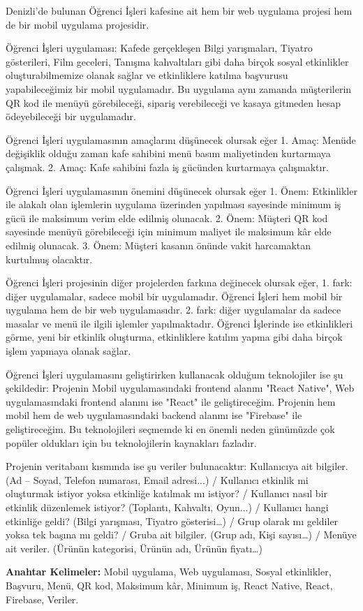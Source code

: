 Denizli’de bulunan Öğrenci İşleri kafesine ait hem bir web uygulama projesi hem de bir mobil uygulama projesidir.

Öğrenci İşleri uygulaması: Kafede gerçekleşen Bilgi yarışmaları, Tiyatro gösterileri, Film geceleri, Tanışma kahvaltıları gibi daha birçok sosyal etkinlikler oluşturabilmemize olanak sağlar ve etkinliklere katılma başvurusu yapabileceğimiz bir mobil uygulamadır. Bu uygulama aynı zamanda müşterilerin QR kod ile menüyü görebileceği, sipariş verebileceği ve kasaya gitmeden hesap ödeyebileceği bir uygulamadır. 

Öğrenci İşleri uygulamasının amaçlarını düşünecek olursak eğer 1. Amaç: Menüde değişiklik olduğu zaman kafe sahibini menü basım maliyetinden kurtarmaya çalışmak. 2. Amaç: Kafe sahibini fazla iş gücünden kurtarmaya çalışmaktır.

Öğrenci İşleri uygulamasının önemini düşünecek olursak eğer 1. Önem: Etkinlikler ile alakalı olan işlemlerin uygulama üzerinden yapılması sayesinde minimum iş gücü ile maksimum verim elde edilmiş olunacak. 2. Önem: Müşteri QR kod sayesinde menüyü görebileceği için minimum maliyet ile maksimum kâr elde edilmiş olunacak. 3. Önem: Müşteri kasanın önünde vakit harcamaktan kurtulmuş olacaktır.

Öğrenci İşleri projesinin diğer projelerden farkına değinecek olursak eğer, 1. fark: diğer uygulamalar, sadece mobil bir uygulamadır. Öğrenci İşleri hem mobil bir uygulama hem de bir web uygulamasıdır. 2. fark: diğer uygulamalar da sadece masalar ve menü ile ilgili işlemler yapılmaktadır. Öğrenci İşlerinde ise etkinlikleri görme, yeni bir etkinlik oluşturma, etkinliklere katılım yapma gibi daha birçok işlem yapmaya olanak sağlar.

Öğrenci İşleri uygulamasını geliştirirken kullanacak olduğum teknolojiler ise şu şekildedir: Projenin Mobil uygulamasındaki frontend alanını "React Native", Web uygulamasındaki frontend alanını ise "React" ile geliştireceğim. Projenin hem mobil hem de web uygulamasındaki backend alanını ise "Firebase" ile geliştireceğim. Bu teknolojileri seçmemde ki en önemli neden günümüzde çok popüler oldukları için bu teknolojilerin kaynakları fazladır. 

Projenin veritabanı kısmında ise şu veriler bulunacaktır: Kullanıcıya ait bilgiler. (Ad – Soyad, Telefon numarası, Email adresi...) / Kullanıcı etkinlik mi oluşturmak istiyor yoksa etkinliğe katılmak mı istiyor? / Kullanıcı nasıl bir etkinlik düzenlemek istiyor? (Toplantı, Kahvaltı, Oyun...) / Kullanıcı hangi etkinliğe geldi? (Bilgi yarışması, Tiyatro gösterisi…) / Grup olarak mı geldiler yoksa tek başına mı geldi? / Gruba ait bilgiler. (Grup adı, Kişi sayısı…) / Menüye ait veriler. (Ürünün kategorisi, Ürünün adı, Ürünün fiyatı…)

\textbf{Anahtar Kelimeler:} Mobil uygulama, Web uygulaması, Sosyal etkinlikler, Başvuru, Menü, QR kod, Maksimum kâr, Minimum iş, React Native, React, Firebase, Veriler.
